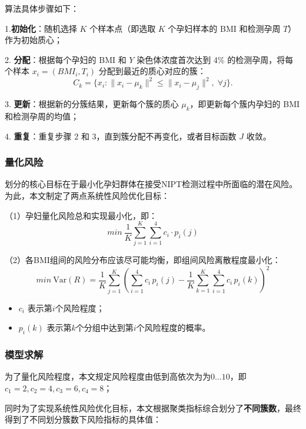 \documentclass[12pt]{ctexart}
\begin{document}
	算法具体步骤如下：
	
		1.\textbf{初始化}：随机选择 \(K\) 个样本点（即选取 \(K\) 个孕妇样本的 BMI 和检测孕周 \(T\)）作为初始质心；
		
		2. \textbf{分配}：根据每个孕妇的 BMI 和 $Y$ 染色体浓度首次达到 4\% 的检测孕周，将每个样本 \(x_i = (BMI_i, T_i)\) 分配到最近的质心对应的簇：
		\[
		C_k = \{x_i : \|x_i - \mu_k\|^2 \leq \|x_i - \mu_j\|^2, \;\forall j\}.
		\]
		
		3. \textbf{更新}：根据新的分簇结果，更新每个簇的质心 \(\mu_k\)，即更新每个簇内孕妇的 BMI 和检测孕周的均值；
		
		4. \textbf{重复}：重复步骤 2 和 3，直到簇分配不再变化，或者目标函数 \(J\) 收敛。
	
	\subsubsection{量化风险}
 	划分的核心目标在于最小化孕妇群体在接受NIPT检测过程中所面临的潜在风险。为此，本文制定了两点系统性风险优化目标：
	
	（1）孕妇量化风险总和实现最小化，即：
	\begin{equation}
		min\ \frac{1}{K}\sum_{j = 1}^{K} \sum_{i = 1}^{4}c_i \cdot p_i(j)
	\end{equation}
	
	（2）各BMI组间的风险分布应该尽可能均衡，即组间风险离散程度最小化：
	\begin{equation}
		min\ \mathrm{Var}(R) = \frac{1}{K}\sum_{j=1}^K 
		\left(
		\sum_{i=1}^4 c_i \, p_i(j) - 
		\frac{1}{K}\sum_{k=1}^K \sum_{i=1}^4 c_i \, p_i(k)
		\right)^2
	\end{equation}
	\begin{itemize}[noitemsep, topsep=0pt, parsep=0pt, partopsep=0pt, leftmargin=1.5em]
		\item $c_i$ 表示第$i$个风险程度；
		\item $p_i(k)$ 表示第$k$个分组中达到第$i$个风险程度的概率。
	\end{itemize}
	\subsubsection{模型求解}
	为了量化风险程度，本文规定风险程度由低到高依次为为$0\dots10$，即$c_1 = 2,c_2 = 4,c_3 = 6,c_4 = 8$；
	
	同时为了实现系统性风险优化目标，本文根据聚类指标综合划分了\textbf{不同簇数}，最终得到了不同划分簇数下风险指标的具体值：
	
\end{document}
